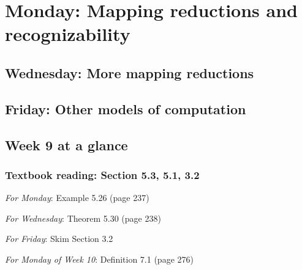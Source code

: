 \newpage


\section*{Monday: Mapping reductions and recognizability}


    
\newpage
\subsection*{Wednesday: More mapping reductions}




\newpage
\subsection*{Friday: Other models of computation}



\newpage

\subsection*{Week 9 at a glance}

\subsubsection*{Textbook reading: Section 5.3, 5.1, 3.2}

{\it For Monday}: Example 5.26 (page 237)

{\it For Wednesday}: Theorem 5.30 (page 238)

{\it For Friday}: Skim Section 3.2

{\it For Monday of Week 10}: Definition 7.1 (page 276)

